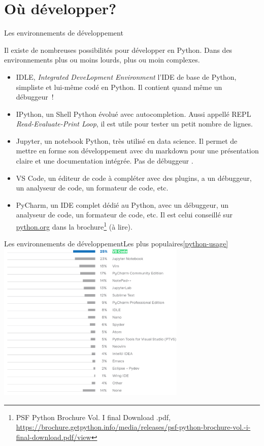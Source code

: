 \documentclass{beamer}
\begin{document}
    \section{Où développer?}\label{sec:where}


    \begin{frame}{Les environnements de développement}
        \begin{small}
            Il existe de nombreuses possibilités pour développer en Python.
            Dans des environnements plus ou moins lourds, plus ou moin complexes.
            \begin{itemize}
                \item IDLE, \textit{Integrated DeveLopment Environment} l'IDE de base de Python, simpliste et lui-même codé en Python.
                Il contient quand même un débuggeur~!
                \item IPython, un Shell Python évolué avec autocompletion.
                Aussi appellé REPL \textit{Read-Evaluate-Print Loop}, il est utile pour tester un petit nombre de lignes.
                \item Jupyter, un notebook Python, très utilisé en data science.
                Il permet de mettre en forme son développement avec du markdown pour une présentation claire et une documentation intégrée.
                Pas de débuggeur .
                \item VS Code, un éditeur de code à compléter avec des plugins, a un débuggeur, un analyseur de code, un formateur de code, etc.
                \item PyCharm, un IDE complet dédié au Python, avec un débuggeur, un analyseur de code, un formateur de code, etc.
                Il est celui conseillé sur \url{python.org} dans la brochure\footnote{PSF Python Brochure Vol. I final Download .pdf, \url{https://brochure.getpython.info/media/releases/psf-python-brochure-vol.-i-final-download.pdf/view}} (à lire).
            \end{itemize}
        \end{small}
    \end{frame}

    \begin{frame}{Les environnements de développement}{Les plus populaires\cref{python-usage}}
        \centering
        \includegraphics[width=9cm]{image/survey-ides}
    \end{frame}
\end{document}

